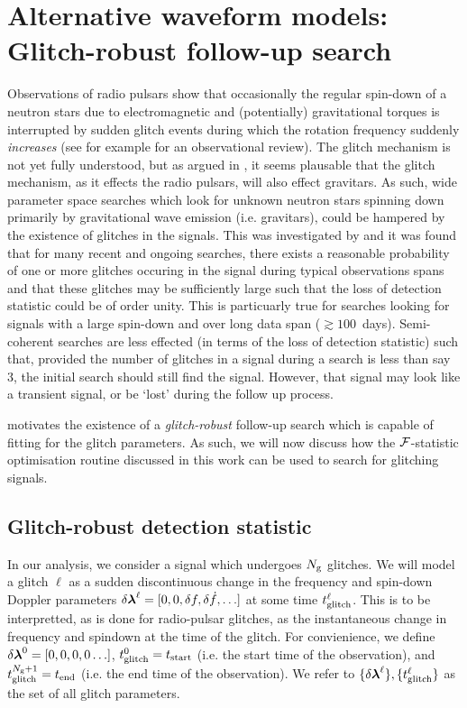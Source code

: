 \documentclass[aps, prd, twocolumn, superscriptaddress, floatfix, showpacs, nofootinbib, longbibliography]{revtex4-1}
\begin{document}
\section{Alternative waveform models: Glitch-robust follow-up search}
\label{sec_glitches}

Observations of radio pulsars show that occasionally the regular spin-down of a
neutron stars due to electromagnetic and (potentially) gravitational torques is
interrupted by sudden glitch events during which the rotation frequency
suddenly \emph{increases} (see for example \citet{espinoza2011} for an
observational review). The glitch mechanism is not yet fully understood, but as
argued in \citet{ashton2017}, it seems plausable that the glitch mechanism, as
it effects the radio pulsars, will also effect gravitars. As such, wide
parameter space searches which look for unknown neutron stars spinning down
primarily by gravitational wave emission (i.e. gravitars), could be hampered by
the existence of glitches in the signals. This was investigated by
\citet{ashton2017} and it was found that for many recent and ongoing searches,
there exists a reasonable probability of one or more glitches occuring in the
signal during typical observations spans and that these glitches may be
sufficiently large such that the loss of detection statistic could be of order
unity. This is particuarly true for searches looking for signals with a large
spin-down and over long data span ($\gtrsim 100$~days). Semi-coherent searches
are less effected (in terms of the loss of detection statistic) such that,
provided the number of glitches in a signal during a search is less than say
3, the initial search should still find the signal. However, that signal may
look like a transient signal, or be `lost' during the follow up process.

\citet{ashton2017} motivates the existence of a \emph{glitch-robust} follow-up search
which is capable of fitting for the glitch parameters.  As such, we will now
discuss how the ${\mathcal{F}}$-statistic optimisation routine discussed in this work can
be used to search for glitching signals.

\subsection{Glitch-robust detection statistic}
In our analysis, we consider a signal which undergoes $N_{\rm g}$ glitches.
We will model a glitch $\ell$ as a sudden discontinuous change in the frequency
and spin-down Doppler parameters $\delta \boldsymbol{\mathbf{\lambda}}^\ell = [0, 0, \delta f,
\delta \dot{f}, \ldots]$ at some time $t_{\rm glitch}^\ell$. This is to be
interpretted, as is done for radio-pulsar glitches, as the instantaneous change
in frequency and spindown at the time of the glitch. For convienience, we
define $\delta\boldsymbol{\mathbf{\lambda}}^0 = [0, 0, 0, 0 \ldots]$, $t_{\rm glitch}^0 =
t_\mathrm{start}$ (i.e. the start time of the observation), and
$t_{\rm glitch}^{N_{\rm g}+1}=t_\mathrm{end}$ (i.e. the end time of the
observation).  We refer to $\{\delta\boldsymbol{\mathbf{\lambda}}^{\ell}\}, \{t_{\rm glitch}^\ell\}$ as
the set of all glitch parameters.
\end{document}
